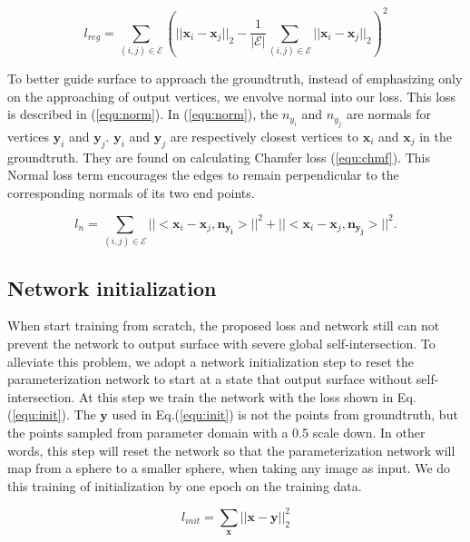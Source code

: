 \begin{equation}
\label{equ:reg}
l_{reg} = \sum_{(i,j)\in\mathcal{E}}(||\mathbf{x}_i-\mathbf{x}_j||_2 - \frac{1}{|\mathcal{E}|}\sum_{(i,j)\in\mathcal{E} }||\mathbf{x}_i-\mathbf{x}_j||_2)^2
\end{equation}

 To better guide surface to approach the groundtruth, instead of emphasizing only on the approaching of output vertices, we envolve normal into our loss. This loss is described in (\ref{equ:norm}). In (\ref{equ:norm}), the $n_{y_i}$ and $n_{y_j}$ are normals for vertices $\mathbf{y}_i$ and $\mathbf{y}_j$. $\mathbf{y}_i$ and $\mathbf{y}_j$ are respectively closest vertices to $\mathbf{x}_i$ and $\mathbf{x}_j$ in the groundtruth. They are found on calculating Chamfer loss (\ref{equ:chmf}). This Normal loss term encourages the edges to remain perpendicular to the corresponding normals of its two end points.

\begin{equation}
\label{equ:norm}
l_{n} = \sum_{(i,j)\in\mathcal{E}}||<\mathbf{x}_i-\mathbf{x}_j,\mathbf{n_{y_i}}>||^2 + ||<\mathbf{x}_i-\mathbf{x}_j,\mathbf{n_{y_j}}>||^2.
\end{equation}

\subsection{Network initialization}
When start training from scratch, the proposed loss and network still can not prevent the network to output surface with severe global self-intersection. To alleviate this problem, we adopt a network initialization step to reset the parameterization network to start at a state that output surface without self-intersection. At this step we train the network with the loss shown in Eq.(\ref{equ:init}). The $\mathbf{y}$ used in Eq.(\ref{equ:init}) is not the points from groundtruth, but the points sampled from parameter domain with a 0.5 scale down. In other words, this step will reset the network so that the parameterization network will map from a sphere to a smaller sphere, when taking any image as input. We do this training of initialization by one epoch on the training data. 

\begin{equation}
\label{equ:init}
l_{init} = \sum_\mathbf{x}||\mathbf{x} - \mathbf{y}||_2^2
\end{equation}

